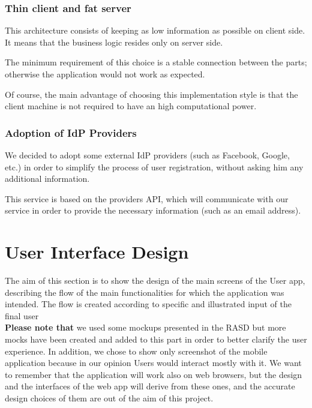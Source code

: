 \documentclass[table, 12pt]{article}
\begin{document}
\subsubsection{Thin client and fat server}
This architecture consists of keeping as low information as possible on client side. It means that the business logic resides only on server side.

The minimum requirement of this choice is a stable connection between the parts; otherwise the application would not work as expected.

Of course, the main advantage of choosing this implementation style is that the client machine is not required to have an high computational power.

\subsubsection{Adoption of IdP Providers}
We decided to adopt some external IdP providers (such as Facebook, Google, etc.) in order to simplify the process of user registration, without asking him any additional information.

This service is based on the providers API, which will communicate with our service in order to provide the necessary information (such as an email address).

\section{User Interface Design}
The aim of this section is to show the design of the main screens of the User app, describing the flow of the main functionalities for which the application was intended. The flow is created according to specific and illustrated input of the final user \\
\textbf{Please note that} we used some mockups presented in the RASD but more mocks have been created and added to this part in order to better clarify the user experience. In addition, we chose to show only screenshot of the mobile application because in our opinion Users would interact mostly with it. We want to remember that the application will work also on web browsers, but the design and the interfaces of the web app will derive from these ones, and the accurate design choices of them are out of the aim of this project. \\
\end{document}
